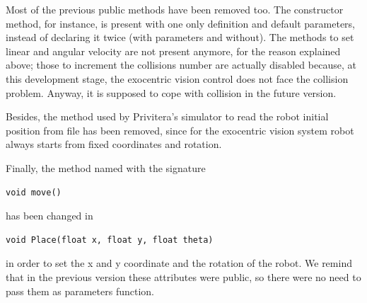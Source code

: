 %
Most of the previous public methods have been removed too. 
The constructor method, for instance, is present with one
only definition and default parameters, instead of declaring 
it twice (with parameters and without). The methods to set
linear and angular velocity are not present anymore, for 
the reason explained above; those to increment the collisions 
number are actually disabled because, at this development 
stage, the exocentric vision control does not face the collision 
problem. Anyway, it is supposed to cope with collision in 
the future version.
%

%
Besides, the method used by Privitera's simulator to read 
the robot initial position from file has been removed, since 
for the exocentric vision system robot always starts from 
fixed coordinates and rotation.
%

%
Finally, the method named with the signature 
\begin{verbatim} 
void move() 
\end{verbatim} 
has been changed in 
\begin{verbatim} 
void Place(float x, float y, float theta)
\end{verbatim}
in order to set the x and y coordinate and the rotation of the robot. 
We remind that in the previous version these attributes
were public, so there were no need to pass them as parameters function.
